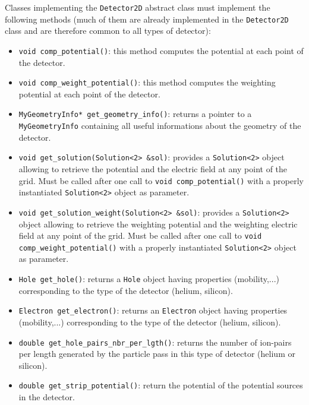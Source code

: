 \documentclass[11pt]{article}
\begin{document}
		Classes	implementing the \texttt{Detector2D} abstract class must implement the
		following methods (much of them are already implemented in the \texttt{Detector2D}
		class and are therefore common to all types of detector):
		\begin{itemize}
			\item \lstinline{void comp_potential()}: this method computes the potential
			at each point of the detector.
			\item \lstinline{void comp_weight_potential()}: this method computes the
			weighting potential	at each point of the detector.
			\item \lstinline{MyGeometryInfo* get_geometry_info()}: returns a pointer
			to a \lstinline{MyGeometryInfo} containing all useful informations about the geometry
			of the detector.

			\item \lstinline{void get_solution(Solution<2> &sol)}: provides
			a \lstinline{Solution<2>} object allowing to retrieve the potential
			and the electric field at any point of the grid. Must be called
			after one call to \lstinline{void comp_potential()} with a properly instantiated
			\lstinline{Solution<2>} object as parameter.

			\item \lstinline{void get_solution_weight(Solution<2> &sol)}: provides
			a \lstinline{Solution<2>} object allowing to retrieve the weighting potential
			and the weighting electric field at any point of the grid. Must be called
			after one call to \lstinline{void comp_weight_potential()} with a properly instantiated
			\lstinline{Solution<2>} object as parameter.

			\item \lstinline{Hole get_hole()}: returns a \texttt{Hole} object having
			properties (mobility,...) corresponding to the type of the detector (helium, silicon).

			\item \lstinline{Electron get_electron()}: returns an \texttt{Electron} object having
			properties (mobility,...) corresponding to the type of the detector (helium, silicon).

			\item \lstinline{double get_hole_pairs_nbr_per_lgth()}: returns the number
			of ion-pairs per length generated by the particle pass in this
			type of detector (helium or silicon).

			\item \lstinline{double get_strip_potential()}: return the potential of
			the potential sources in the detector.


\end{itemize}
\end{document}
